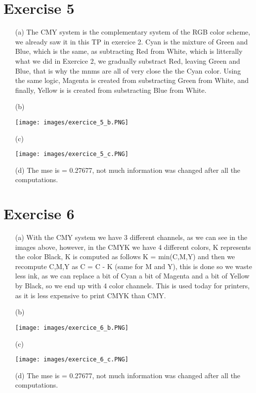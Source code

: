 \documentclass[a4paper]{article}
\begin{document}
\section*{Exercise 5}
\begin{itemize}
\item[(a)] The CMY system is the complementary system of the RGB color scheme, we already saw it in this TP in exercice 2. Cyan is the mixture of Green and Blue, which is the same, as subtracting Red from White, which is litterally what we did in Exercice 2, we gradually substract Red, leaving Green and Blue, that is why the mnms are all of very close the the Cyan color. Using the same logic, Magenta is created from substracting Green from White, and finally, Yellow is is created from substracting Blue from White.
\item[(b)]
\begin{center}
\texttt{[image: images/exercice\_5\_b.PNG]}\\[1cm] 
\end{center}
\item[(c)]
\begin{center}
\texttt{[image: images/exercice\_5\_c.PNG]}\\[1cm] 
\end{center}
\item[(d)] The mse is = 0.27677, not much information was changed after all the computations.
\end{itemize}

\section*{Exercise 6}
\begin{itemize}
\item[(a)] With the CMY system we have 3 different channels, as we can see in the images above, however, in the CMYK we have 4 different colors, K represents the color Black, K is computed as follows K = min(C,M,Y) and then we recompute C,M,Y as C = C - K (same for M and Y), this is done so we waste less ink, as we can replace a bit of Cyan a bit of Magenta and a bit of Yellow by Black, so we end up with 4 color channels. This is used today for printers, as it is less expensive to print CMYK than CMY.
\item[(b)]
\begin{center}
\texttt{[image: images/exercice\_6\_b.PNG]}\\[1cm] 
\end{center}
\item[(c)]
\begin{center}
\texttt{[image: images/exercice\_6\_c.PNG]}\\[1cm] 
\end{center}
\item[(d)] The mse is = 0.27677, not much information was changed after all the computations.
\end{itemize}
\end{document}
